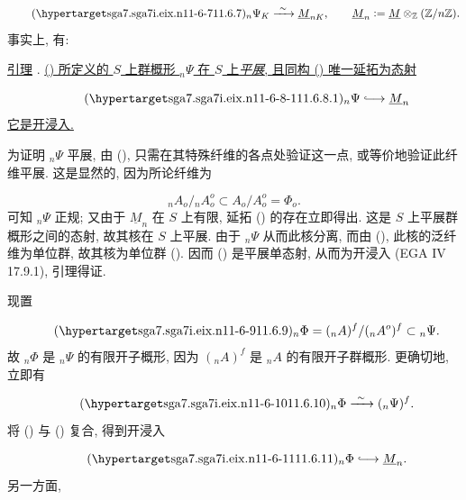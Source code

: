 \begin{equation}\tag{\SGARefTarget{sga7.sga7i.eix.n11-6-7}{11.6.7}}
{}_n\Psi_K\xrightarrow{\ \sim\ }\underline M_{nK},
\qquad
\underline M_n\mathrel{\mathop:}=\underline M
 \otimes_{\mathbb Z}(\mathbb Z/n\mathbb Z).
\end{equation}
事实上, 有:

\medskip
\noindent
\underline{引理} . \underline{() 所定义的 $S$ 上群概形 ${}_n\Psi$ 在 $S$ 上\emph{平展}, 且同构 () 唯一延拓为态射}

\begin{equation}\tag{\SGARefTarget{sga7.sga7i.eix.n11-6-8-1}{11.6.8.1}}
{}_n\Psi\lhook\joinrel\longrightarrow\underline M_n
\end{equation}
\underline{它是开浸入.}

为证明 ${}_n\Psi$ 平展, 由 (), 只需在其特殊纤维的各点处验证这一点, 或等价地验证此纤维平展. 这是显然的, 因为所论纤维为

\begin{equation*}
{}_nA_o/{}_nA_o^o\subset A_o/A_o^o=\Phi_o.
\end{equation*}
可知 ${}_n\Psi$ 正规; 又由于 $\underline M_n$ 在 $S$ 上有限, 延拓 () 的存在立即得出. 这是 $S$ 上平展群概形之间的态射, 故其核在 $S$ 上平展. 由于 ${}_n\Psi$ 从而此核分离, 而由 (), 此核的泛纤维为单位群, 故其核为单位群 (). 因而 () 是平展单态射, 从而为开浸入 (EGA IV 17.9.1), 引理得证.

现置

\begin{equation}\tag{\SGARefTarget{sga7.sga7i.eix.n11-6-9}{11.6.9}}
{}_n\Phi=({}_nA)^f/({}_nA^o)^f\subset{}_n\Psi.
\end{equation}
故 ${}_n\Phi$ 是 ${}_n\Psi$ 的有限开子概形, 因为 $({}_nA)^f$ 是 ${}_nA$ 的有限开子群概形. 更确切地, 立即有

\begin{equation}\tag{\SGARefTarget{sga7.sga7i.eix.n11-6-10}{11.6.10}}
{}_n\Phi\xrightarrow{\ \sim\ }({}_n\Psi)^f.
\end{equation}
将 () 与 () 复合, 得到开浸入

\begin{equation}\tag{\SGARefTarget{sga7.sga7i.eix.n11-6-11}{11.6.11}}
{}_n\Phi\lhook\joinrel\longrightarrow\underline M_n.
\end{equation}
另一方面,

